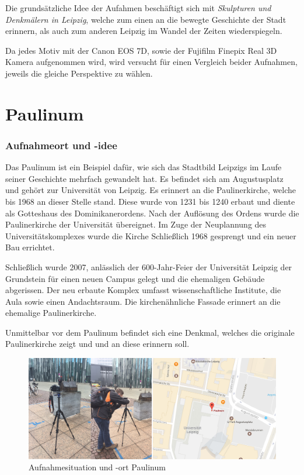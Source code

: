\documentclass[liststotoc,bibtotoc,fontsize=14pt,]{scrreprt}
\begin{document}
	\bigskip
	Die grundsätzliche Idee der Aufahmen beschäftigt sich mit \textit{Skulpturen und Denkmälern in Leipzig}, welche zum einen an die bewegte Geschichte der Stadt erinnern, als auch zum anderen Leipzig im Wandel der Zeiten wiederspiegeln.
	
	\bigskip
	Da jedes Motiv mit der Canon EOS 7D, sowie der Fujifilm Finepix Real 3D Kamera aufgenommen wird, wird versucht für einen Vergleich beider Aufnahmen, jeweils die gleiche Perspektive zu wählen. 
	
	\section{Paulinum }
	\label{sec:paulinum}
	\subsubsection{Aufnahmeort und -idee}
		Das Paulinum ist ein Beispiel dafür, wie sich das Stadtbild Leipzigs im Laufe seiner Geschichte mehrfach gewandelt hat. Es befindet sich am Augustusplatz und gehört zur Universität von Leipzig. Es erinnert an die Paulinerkirche, welche bis 1968 an dieser Stelle stand. Diese wurde von 1231 bis 1240 erbaut und diente als Gotteshaus des Dominikanerordens. Nach der Auflösung des Ordens wurde die Paulinerkirche der Universität übereignet. Im Zuge der Neuplannung des Universitätskomplexes wurde die Kirche Schließlich 1968 gesprengt und ein neuer Bau errichtet. 
		
		\bigskip
		Schließlich wurde 2007, anlässlich der 600-Jahr-Feier der Universität Leipzig der Grundstein für einen neuen Campus gelegt und die ehemaligen Gebäude abgerissen. Der neu erbaute Komplex umfasst wissenschaftliche Institute, die Aula sowie einen Andachtsraum. Die kirchenähnliche Fassade erinnert an die ehemalige Paulinerkirche. 
		
		\bigskip
		Unmittelbar vor dem Paulinum befindet sich eine Denkmal, welches die originale Paulinerkirche zeigt und und an diese erinnern soll.
		
		\begin{figure}[H]
			\includegraphics[width=\linewidth]{img/places/paulinum.jpg}
			\caption{Aufnahmesituation und -ort Paulinum}
			\label{img:paulinum_map}
		\end{figure}
\end{document}
